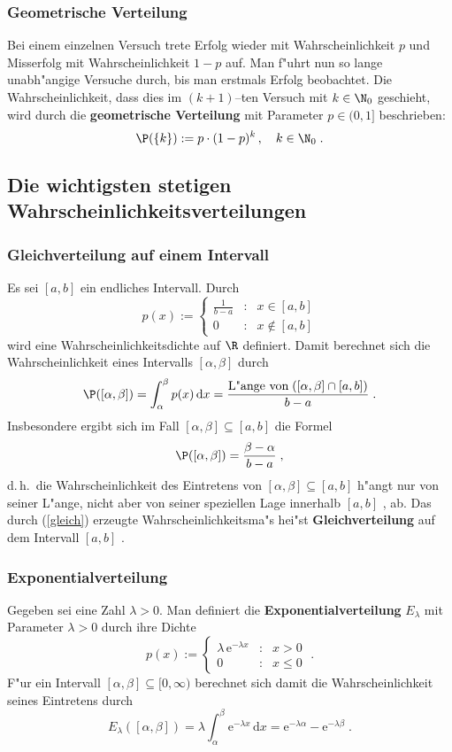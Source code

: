 \subsubsection{Geometrische Verteilung}
Bei einem einzelnen Versuch trete Erfolg wieder mit Wahrscheinlichkeit $p$ und Misserfolg
mit Wahrscheinlichkeit $1-p$ auf. Man f"uhrt nun so lange unabh"angige Versuche durch, bis
man erstmals Erfolg beobachtet. Die Wahrscheinlichkeit, dass dies im $(k+1)$--ten Versuch mit
$k\in\N_0$ geschieht, wird durch die \textbf{geometrische Verteilung} mit Parameter $p\in(0,1]$
beschrieben$\colon$
$$
\P(\{k\}):= p\cdot(1-p)^k\,,\quad k\in\N_0\;.
$$
\subsection{Die wichtigsten stetigen Wahrscheinlichkeitsverteilungen}

\subsubsection{Gleichverteilung auf einem Intervall}
Es sei $[a,b]$ ein endliches Intervall. Durch
$$
p(x):=\left\{
\begin{array}{ccl}
\frac{1}{b-a} &:& x\in [a,b]\\
 0 &:& x\notin [a,b]
\end{array}
\right.
$$
wird eine Wahrscheinlichkeitsdichte auf $\R$ definiert. Damit berechnet sich die Wahrscheinlichkeit
eines Intervalls $[\alpha,\beta]$ durch
\begin{equation}
\label{gleich}
\P([\alpha,\beta])=\int_\alpha^\beta p(x)\,\mathrm dx= \frac{\mbox{L"ange von}\;([\alpha,\beta]\cap[a,b])}
{b-a}\;.
\end{equation}
Insbesondere ergibt sich im Fall $[\alpha,\beta]\subseteq [a,b]$ die Formel
$$
\P([\alpha,\beta])= \frac{\beta-\alpha}{b-a}\;,
$$
d.\,h.~die Wahrscheinlichkeit des Eintretens von $[\alpha,\beta]\subseteq[a,b]$
 h"angt nur von seiner L"ange, nicht aber von
seiner speziellen Lage innerhalb $[a,b]$ , ab.
Das durch (\ref{gleich}) erzeugte Wahrscheinlichkeitsma"s hei"st \textbf{Gleichverteilung} auf dem
Intervall $[a,b]$ .
\subsubsection{Exponentialverteilung}
Gegeben sei eine Zahl $\lambda>0$. Man definiert die
\textbf{Exponentialverteilung} $E_\lambda$ mit Parameter $\lambda>0$ durch
ihre Dichte
$$
p(x):=\left\{
\begin{array}{ccr}
\lambda\,\mathrm e^{-\lambda x} &:& x>0\\
0 &:& x\le 0
\end{array}
\right.\;.
$$
F"ur ein Intervall $[\alpha,\beta]\subseteq [0,\infty)$ berechnet sich damit
die Wahrscheinlichkeit seines Eintretens durch
$$
E_\lambda([\alpha,\beta])=\lambda \int_\alpha^\beta \mathrm e^{-\lambda x}\,\mathrm dx
= \mathrm e^{-\lambda\alpha}- \mathrm e^{-\lambda\beta}\;.
$$
